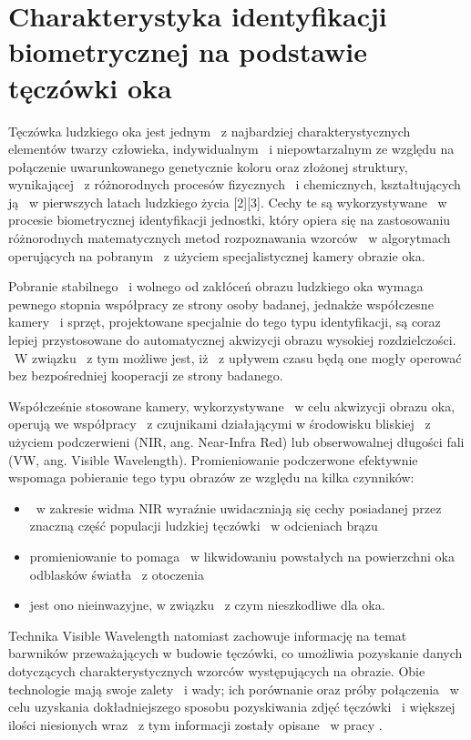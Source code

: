 
\section{Charakterystyka identyfikacji biometrycznej na podstawie tęczówki oka}
\label{sec:zawartoscPracy}


Tęczówka ludzkiego oka jest jednym ~z najbardziej charakterystycznych elementów twarzy człowieka, indywidualnym ~i niepowtarzalnym ze względu na połączenie uwarunkowanego genetycznie koloru oraz złożonej struktury, wynikającej ~z różnorodnych procesów fizycznych ~i chemicznych, kształtujących ją ~w pierwszych latach ludzkiego życia [2][3]. Cechy te są wykorzystywane ~w procesie biometrycznej identyfikacji jednostki, który opiera się na zastosowaniu różnorodnych matematycznych metod rozpoznawania wzorców ~w algorytmach operujących na pobranym ~z użyciem specjalistycznej kamery obrazie oka.

Pobranie stabilnego ~i wolnego od zakłóceń obrazu ludzkiego oka wymaga pewnego stopnia współpracy ze strony osoby badanej, jednakże współczesne kamery ~i sprzęt, projektowane specjalnie do tego typu identyfikacji, są  coraz lepiej przystosowane do automatycznej akwizycji obrazu wysokiej rozdzielczości. ~W związku ~z tym możliwe jest, iż ~z upływem czasu będą one mogły operować bez bezpośredniej kooperacji ze strony badanego.

Współcześnie stosowane kamery, wykorzystywane ~w celu akwizycji obrazu oka, operują we współpracy ~z czujnikami działającymi w środowisku bliskiej ~z użyciem podczerwieni (NIR, ang. Near-Infra Red) lub obserwowalnej długości fali (VW, ang. Visible Wavelength). Promieniowanie podczerwone efektywnie wspomaga pobieranie tego typu obrazów ze względu na kilka czynników:
\begin{itemize} 
\item ~w zakresie widma NIR wyraźnie uwidaczniają się cechy posiadanej przez znaczną część populacji ludzkiej tęczówki ~w  odcieniach brązu
\item promieniowanie to pomaga ~w likwidowaniu powstałych na powierzchni oka odblasków światła ~z otoczenia 
\item jest ono nieinwazyjne, w związku ~z czym nieszkodliwe dla oka.
\end{itemize}
 Technika Visible Wavelength natomiast zachowuje informację na temat barwników przeważających w budowie tęczówki, co umożliwia pozyskanie danych dotyczących charakterystycznych wzorców występujących na obrazie. Obie technologie mają swoje zalety ~i wady; ich porównanie oraz próby połączenia ~w celu uzyskania dokładniejszego sposobu pozyskiwania zdjęć tęczówki ~i większej ilości niesionych wraz ~z tym informacji zostały opisane ~w pracy \cite{Hos10}. 


